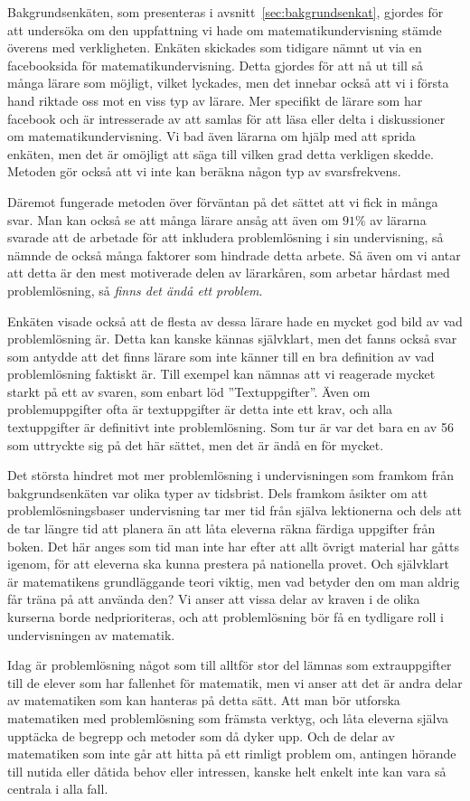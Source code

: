 \textcolor{lila}{Bakgrundsenkäten, som presenteras i avsnitt~\ref{sec:bakgrundsenkat}, gjordes för att undersöka om den uppfattning vi hade om matematikundervisning stämde överens med verkligheten. Enkäten skickades som tidigare nämnt ut via en facebooksida för matematikundervisning. Detta gjordes för att nå ut till så många lärare som möjligt, vilket lyckades, men det innebar också att vi i första hand riktade oss mot en viss typ av lärare. Mer specifikt de lärare som har facebook och är intresserade av att samlas för att läsa eller delta i diskussioner om matematikundervisning. Vi bad även lärarna om hjälp med att sprida enkäten, men det är omöjligt att säga till vilken grad detta verkligen skedde. Metoden gör också att vi inte kan beräkna någon typ av svarsfrekvens.}

\textcolor{lila}{Däremot fungerade metoden över förväntan på det sättet att vi fick in många svar. Man kan också se att många lärare ansåg att även om $91\%$ av lärarna svarade att de arbetade för att inkludera problemlösning i sin undervisning, så nämnde de också många faktorer som hindrade detta arbete. Så även om vi antar att detta är den mest motiverade delen av lärarkåren, som arbetar hårdast med problemlösning, så \textsl{finns det ändå ett problem}.}

\textcolor{lila}{Enkäten visade också att de flesta av dessa lärare hade en mycket god bild av vad problemlösning är. Detta kan kanske kännas självklart, men det fanns också svar som antydde att det finns lärare som inte känner till en bra definition av vad problemlösning faktiskt är. Till exempel kan nämnas att vi reagerade mycket starkt på ett av svaren, som enbart löd ''Textuppgifter''. Även om problemuppgifter ofta är textuppgifter är detta inte ett krav, och alla textuppgifter är definitivt inte problemlösning. Som tur är var det bara en av 56 som uttryckte sig på det här sättet, men det är ändå en för mycket.}

\textcolor{lila}{Det största hindret mot mer problemlösning i undervisningen som framkom från bakgrundsenkäten var olika typer av tidsbrist. Dels framkom åsikter om att problemlösningsbaser undervisning tar mer tid från själva lektionerna och dels att de tar längre tid att planera än att låta eleverna räkna färdiga uppgifter från boken. Det här anges som tid man inte har efter att allt övrigt material har gåtts igenom, för att eleverna ska kunna prestera på nationella provet. Och självklart är matematikens grundläggande teori viktig, men vad betyder den om man aldrig får träna på att använda den? Vi anser att vissa delar av kraven i de olika kurserna borde nedprioriteras, och att problemlösning bör få en tydligare roll i undervisningen av matematik.} 

\textcolor{lila}{Idag är problemlösning något som till alltför stor del lämnas som extrauppgifter till de elever som har fallenhet för matematik, men vi anser att det är andra delar av matematiken som kan hanteras på detta sätt. Att man bör utforska matematiken med problemlösning som främsta verktyg, och låta eleverna själva upptäcka de begrepp och metoder som då dyker upp. Och de delar av matematiken som inte går att hitta på ett rimligt problem om, antingen hörande till nutida eller dåtida behov eller intressen, kanske helt enkelt inte kan vara så centrala i alla fall.}